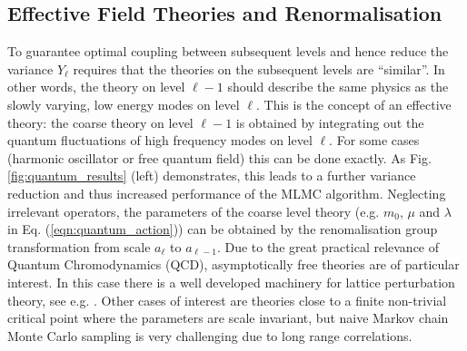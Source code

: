 \documentclass[11pt]{article}
\begin{document}
\subsection{Effective Field Theories and Renormalisation}
To guarantee optimal coupling between subsequent levels and hence reduce the variance $Y_\ell$ requires that the theories on the subsequent levels are ``similar''. In other words, the theory on level $\ell-1$ should describe the same physics as the slowly varying, low energy modes on level $\ell$. This is the concept of an effective theory: the coarse theory on level $\ell-1$ is obtained by integrating out the quantum fluctuations of high frequency modes on level $\ell$. For some cases (harmonic oscillator or free quantum field) this can be done exactly. As Fig. \ref{fig:quantum_results} (left) demonstrates, this leads to a further variance reduction and thus increased performance of the MLMC algorithm. Neglecting irrelevant operators, the parameters of the coarse level theory (e.g. $m_0$, $\mu$ and $\lambda$ in Eq. (\ref{eqn:quantum_action})) can be obtained by the renomalisation group transformation from scale $a_\ell$ to $a_{\ell-1}$. Due to the great practical relevance of Quantum Chromodynamics (QCD), asymptotically free theories are of particular interest. In this case there is a well developed machinery for lattice perturbation theory, see e.g. \cite{Hart2009}. Other cases of interest are theories close to a finite non-trivial critical point where the parameters are scale invariant, but naive Markov chain Monte Carlo sampling is very challenging due to long range correlations.
\end{document}
